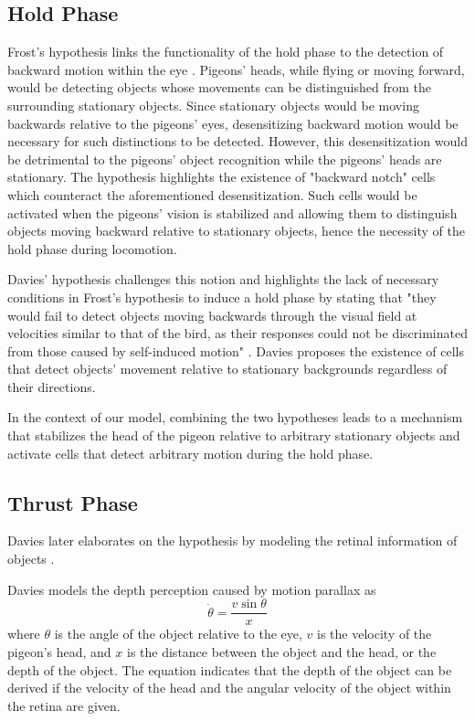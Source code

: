 \subsection{Hold Phase}
  Frost's hypothesis links the functionality of the hold phase to the detection of backward motion within the eye \cite{frost1978optokinetic}. Pigeons' heads, while flying or moving forward, would be detecting objects whose movements can be distinguished from the surrounding stationary objects. Since stationary objects would be moving backwards relative to the pigeons' eyes, desensitizing backward motion would be necessary for such distinctions to be detected. However, this desensitization would be detrimental to the pigeons' object recognition while the pigeons' heads are stationary. The hypothesis highlights the existence of "backward notch" cells which counteract the aforementioned desensitization. Such cells would be activated when the pigeons' vision is stabilized and allowing them to distinguish objects moving backward relative to stationary objects, hence the necessity of the hold phase during locomotion.

  Davies' hypothesis challenges this notion and highlights the lack of necessary conditions in Frost's hypothesis to induce a hold phase by stating that "they would fail to detect objects moving backwards through the visual field at velocities similar to that of the bird, as their responses could not be discriminated from those caused by self-induced motion" \cite{davies1988head}. Davies proposes the existence of cells that detect objects' movement relative to stationary backgrounds regardless of their directions.

  In the context of our model, combining the two hypotheses leads to a mechanism that stabilizes the head of the pigeon relative to arbitrary stationary objects and activate cells that detect arbitrary motion during the hold phase.

\subsection{Thrust Phase}

    Davies later elaborates on the hypothesis by modeling the retinal information of objects \cite{davies1988head}.

    Davies models the depth perception caused by motion parallax as
    \begin{equation}
      \dot \theta = \frac {v \sin \theta} {x}
    \end{equation}
    where $\theta$ is the angle of the object relative to the eye, $v$ is the velocity of the pigeon's head, and $x$ is the distance between the object and the head, or the depth of the object. The equation indicates that the depth of the object can be derived if the velocity of the head and the angular velocity of the object within the retina are given.

